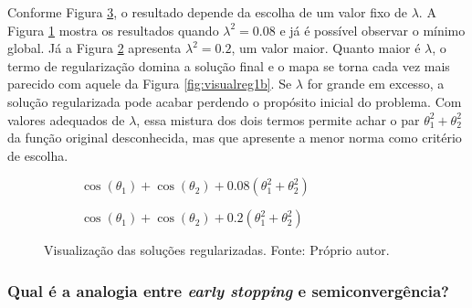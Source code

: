 Conforme Figura \ref{fig:visualreg2}, o resultado depende da escolha de um valor fixo de $\lambda$.  A Figura \ref{fig:visualreg2a} mostra os resultados quando $\lambda^2 = 0.08$ e já é possível observar o mínimo global. Já a Figura \ref{fig:visualreg2b} apresenta $\lambda^2 = 0.2$, um valor maior. Quanto maior é $\lambda$, o termo de regularização domina a solução final e o mapa se torna cada vez mais parecido com aquele da Figura \ref{fig:visualreg1b}. Se $\lambda$ for grande em excesso, a solução regularizada pode acabar perdendo o propósito inicial do problema. Com valores adequados de $\lambda$, essa mistura dos dois termos permite achar o par  $\theta_1^2 + \theta_2^2$ da função original desconhecida, mas que apresente a menor norma como critério de escolha. 

 \begin{figure}[H]
     \centering
   \begin{subfigure}[b]{0.49\textwidth}
         \centering
         \caption{$\cos(\theta_1) + \cos(\theta_2) + 0.08(\theta_1^2 + \theta_2^2)$}
                  \label{fig:visualreg2a}
      \end{subfigure}
     \hfill
     \begin{subfigure}[b]{0.49\textwidth}
         \centering
         \caption{$\cos(\theta_1) + \cos(\theta_2) + 0.2(\theta_1^2 + \theta_2^2)$}
                  \label{fig:visualreg2b}
       \end{subfigure}
     \caption[Visualização das soluções regularizadas.]{Visualização das soluções regularizadas. Fonte: Próprio autor.}
     \label{fig:visualreg2}
 \end{figure}



\subsubsection{Qual é a analogia entre \textit{early stopping} e semiconvergência?}\label{sec:early}


